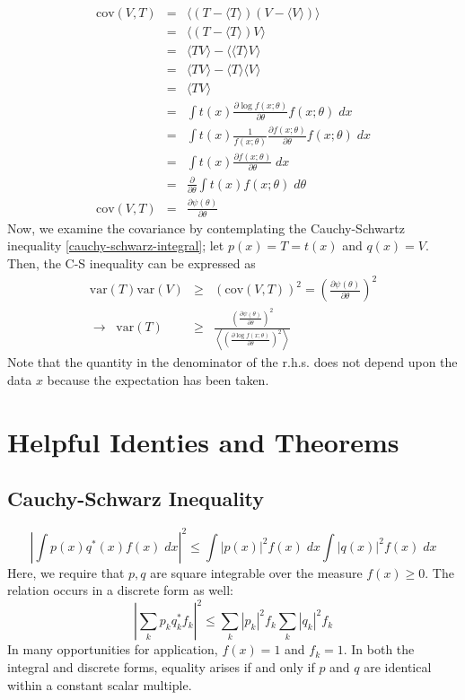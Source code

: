 \begin{eqnarray}
\textrm{cov}(V,T) &=& \langle (T - \langle T \rangle)(V - \langle V
\rangle)\rangle \\
&=& \langle (T - \langle T \rangle) V\rangle \\
&=& \langle T V \rangle - \langle \langle T \rangle V\rangle \\
&=& \langle T V \rangle - \langle T \rangle \langle V\rangle \\
&=& \langle T V \rangle \\
&=& \int t(x) \frac{\partial \log f(x; \theta)}{\partial \theta} f(x;
\theta)\; dx \\
&=& \int t(x) \frac{1}{f(x; \theta)} \frac{\partial f(x;
  \theta)}{\partial \theta} f(x; \theta) \; dx \\
&=& \int t(x) \frac{\partial f(x; \theta)}{\partial \theta} \; dx \\
&=& \frac{\partial}{\partial \theta} \int t(x) f(x; \theta) \; d\theta \\
\textrm{cov}(V,T) &=& \frac{\partial \psi(\theta)}{\partial \theta}
\end{eqnarray}
Now, we examine the covariance by contemplating the Cauchy-Schwartz
inequality \eqref{cauchy-schwarz-integral}; let $p(x) = T = t(x)$ and
$q(x) = V$.  Then, the C-S inequality can be expressed as
\begin{eqnarray}
\textrm{var}(T) \textrm{var}(V) &\ge& \left(\textrm{cov}(V,T)\right)^2
= \left(\frac{\partial \psi(\theta)}{\partial \theta} \right)^2 \\
\rightarrow \;\; \textrm{var}(T) &\ge& 
\frac{\left(\frac{\partial \psi(\theta)}{\partial \theta}\right)^2}
     {\left\langle \left(\frac{\partial \log f(x; \theta)}{\partial \theta}\right)^2\right\rangle}
\end{eqnarray}
Note that the quantity in the denominator of the r.h.s. does not
depend upon the data $x$ because the expectation has been taken.

\chapter{Helpful Identies and Theorems}

\section{Cauchy-Schwarz Inequality}

\begin{equation} \label{e:cauchy-schwarz-integral}
\left| \int p(x) q^\ast(x) f(x) \; dx \right|^2 \le 
\int |p(x)|^2 f(x) \; dx \int |q(x)|^2 f(x) \; dx 
\end{equation}
Here, we require that $p, q$ are square integrable over the measure
$f(x) \ge 0$.  The relation occurs in a discrete form as well:
\begin{equation}
\left| \sum_k p_k q_k^\ast f_k \right|^2 \le
  \sum_k |p_k|^2 f_k \sum_k |q_k|^2 f_k
\end{equation}
In many opportunities for application, $f(x) = 1$ and $f_k = 1$.  In
both the integral and discrete forms, equality arises if and only if
$p$ and $q$ are identical within a constant scalar multiple.

